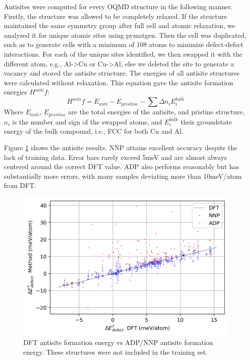 \documentclass{article}
\begin{document}
Antisites were computed for every OQMD structure in the following manner.
Firstly, the structure was allowed to be completely relaxed.
If the structure maintained the same symmetry group after full cell and atomic relaxation, we analyzed it for unique atomic sites using pymatgen.
Then the cell was duplicated, such as to generate cells with a minimum of 108 atoms to minimize defect-defect interactions.
For each of the unique sites identified, we then swapped it with the different atom, e.g., Al->Cu or Cu->Al, else we deleted the site to generate a vacancy and stored the antisite structure.
The energies of all antisite structures were calculated without relaxation.
This equation gave the antisite formation energies $H^{anti}f$:
\begin{equation}
H^{anti}f = E_{anti} - E_{pristine} - \sum\Delta n_i E^{bulk}_i
\end{equation}
Where $E_{anti}$, $E_{pristine}$ are the total energies of the antisite, and pristine structure, $n_i$ is the 
number and sign of the swapped atoms, and $E^{bulk}_i$ their groundstate energy of the bulk compound, i.e., FCC for 
both Cu and Al.

Figure \ref{fig:antisite_plot} shows the antisite results.
NNP attains excellent accuracy despite the lack of training data.
Error bars rarely exceed 5meV and are almost always centered around the correct DFT value.
ADP also performs reasonably but has substantially more errors, with many samples deviating more than 10meV/atom from DFT. 


\begin{figure}[H]%
\centering%
\includegraphics[width=1.2\textwidth,center]{./figures/antisite_plot.png}%
\caption{DFT antisite formation energy vs ADP/NNP antisite formation energy.
These structures were not included in the training set.}%
\label{fig:antisite_plot}
\end{figure}
\end{document}
